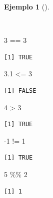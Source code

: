\documentclass[
  a4paper,
]{scrreport}
\newenvironment{Shaded}{\begin{snugshade}}{\end{snugshade}}
\newcommand{\DecValTok}[1]{\textcolor[rgb]{0.68,0.00,0.00}{#1}}
\newcommand{\FloatTok}[1]{\textcolor[rgb]{0.68,0.00,0.00}{#1}}
\newcommand{\SpecialCharTok}[1]{\textcolor[rgb]{0.37,0.37,0.37}{#1}}
\theoremstyle{definition}
\theoremstyle{definition}
\newtheorem{example}{Ejemplo}[chapter]
\theoremstyle{remark}
\begin{document}
\begin{example}[]\protect\hypertarget{exm-operadores-relacionales}{}\label{exm-operadores-relacionales}

~

\begin{Shaded}
\begin{Highlighting}[]
\DecValTok{3} \SpecialCharTok{==} \DecValTok{3}
\end{Highlighting}
\end{Shaded}

\begin{verbatim}
[1] TRUE
\end{verbatim}

\begin{Shaded}
\begin{Highlighting}[]
\FloatTok{3.1} \SpecialCharTok{\textless{}=} \DecValTok{3}
\end{Highlighting}
\end{Shaded}

\begin{verbatim}
[1] FALSE
\end{verbatim}

\begin{Shaded}
\begin{Highlighting}[]
\DecValTok{4} \SpecialCharTok{\textgreater{}} \DecValTok{3}
\end{Highlighting}
\end{Shaded}

\begin{verbatim}
[1] TRUE
\end{verbatim}

\begin{Shaded}
\begin{Highlighting}[]
\SpecialCharTok{{-}}\DecValTok{1} \SpecialCharTok{!=} \DecValTok{1}
\end{Highlighting}
\end{Shaded}

\begin{verbatim}
[1] TRUE
\end{verbatim}

\begin{Shaded}
\begin{Highlighting}[]
\DecValTok{5} \SpecialCharTok{\%\%} \DecValTok{2}
\end{Highlighting}
\end{Shaded}

\begin{verbatim}
[1] 1
\end{verbatim}


\end{example}
\end{document}
